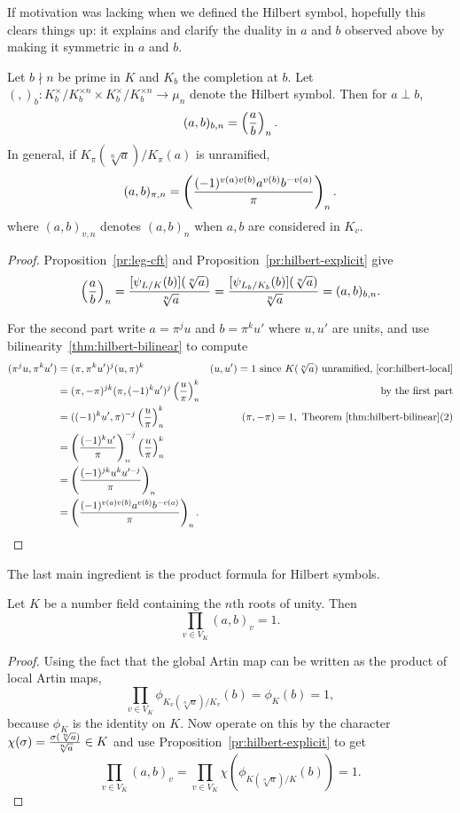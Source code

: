 If motivation was lacking when we defined the Hilbert symbol, hopefully this clears things up: it explains and clarify the duality in $a$ and $b$ observed above by making it symmetric in $a$ and $b$.
\begin{pr}
Let $b\nmid n$ be prime in $K$ and $K_b$ the completion at $b$. 
Let $(,)_b:K_b^{\times}/K_b^{\times n}\times K_b^{\times}/K_b^{\times n}\to \mu_n$ denote the Hilbert symbol. Then for $a\perp b$,
\[
(a,b)_{b,n}=\left( {\frac{a}{b}} \right)_n.
\]
In general, if $K_{\pi}(\sqrt[n] a)/K_{\pi}(a)$ is unramified,  %
\[
(a,b)_{\pi,n}=\left( {\frac{(-1)^{v(a)v(b)}a^{v(b)}b^{-v(a)}}{\pi}} \right)_n.
\]
where $(a,b)_{v,n}$ denotes $(a,b)_n$ when $a,b$ are considered in $K_v$.
\end{pr}
\begin{proof}
Proposition~\ref{pr:leg-cft} and Proposition~\ref{pr:hilbert-explicit} give
\[
\left( {\frac{a}{b}} \right)_n=\frac{[\psi_{L/K}(b)](\sqrt[n]{a})}{\sqrt[n]a}=\frac{[\psi_{L_b/K_b}(b)](\sqrt[n]{a})}{\sqrt[n]a}=(a,b)_{b,n}.
\]

For the second part write $a=\pi^ju$ and $b=\pi^ku'$ where $u,u'$ are units, and use bilinearity~\ref{thm:hilbert-bilinear} to compute
\begin{align*}
(\pi^ju,\pi^ku')&=(\pi, \pi^ku')^j(u,\pi)^k&(u,u')=1\text{ since }K(\sqrt[n]a)\text{ unramified,~\ref{cor:hilbert-local}}\\
&=(\pi,-\pi)^{jk}(\pi, (-1)^ku')^j\left( {\frac{u}{\pi}} \right)_n^k&\text{by the first part}\\
&=((-1)^ku',\pi)^{-j}\left( {\frac{u}{\pi}} \right)_n^k&(\pi,-\pi)=1,\text{ Theorem~\ref{thm:hilbert-bilinear}(2)}\\
&=\left( {\frac{(-1)^ku'}{\pi}} \right)_n^{-j}\left( {\frac{u}{\pi}} \right)_n^k\\
&=\left( {\frac{(-1)^{jk}u^ku'^{-j}}{\pi}} \right)_n\\
&=\left( {\frac{(-1)^{v(a)v(b)}a^{v(b)}b^{-v(a)}}{\pi}} \right)_n.
\end{align*}
\end{proof}
The last main ingredient is the product formula for Hilbert symbols.
\begin{thm}
Let $K$ be a number field containing the $n$th roots of unity. Then
\[
\prod_{v\in V_K} (a,b)_v=1.
\]
\end{thm}
\begin{proof}
Using the fact that the global Artin map can be written as the product of local Artin maps,
\[
\prod_{v\in V_K}\phi_{K_v(\sqrt[n]{a})/K_v}(b)=\phi_K(b)=1,
\]
because $\phi_K$ is the identity on $K$. 
Now operate on this by the character $\chi(\sigma)=\frac{\sigma(\sqrt[n]a)}{\sqrt[n]a}\in K$ and use Proposition~\ref{pr:hilbert-explicit} %
 to get
\[
\prod_{v\in V_K} (a,b)_{v}=\prod_{v\in V_K}\chi(\phi_{K(\sqrt[n]{a})/K}(b))=1.
\]
\end{proof}
